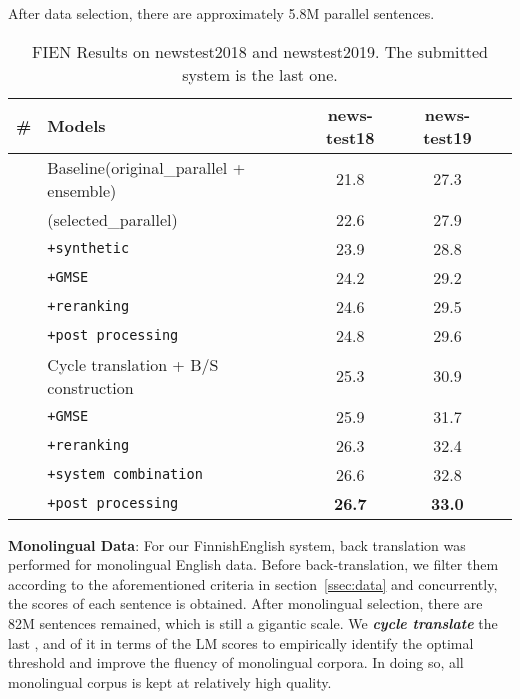 \documentclass[11pt,a4paper]{article}
\begin{document}
After data selection, there are approximately 5.8M parallel sentences.\\


\begin{table*}[hbt]
    \begin{center}
    \begin{tabular}{l|l|c|c|c}
    \hline
    \textbf{\#} & \textbf{Models} & news-test18 & news-test19 & \\ 
    \hline
     & Baseline\small{(original\_parallel + ensemble)} & 21.8 & 27.3 &  \\
    \hline
     & \small{(selected\_parallel)} & 22.6 & 27.9 &  \\
    \hline
     & \verb|+synthetic| & 23.9 & 28.8 & \\
     & \verb|+GMSE| & 24.2 & 29.2 & \\
     & \verb|+reranking| & 24.6 & 29.5 & \\
     & \verb|+post processing| & 24.8 & 29.6 & \\
    \hline
     & Cycle translation + B/S construction & 25.3 & 30.9 &  \\
    \hline
     & \verb|+GMSE| & 25.9 & 31.7 & \\
     & \verb|+reranking| & 26.3 & 32.4 & \\
     & \verb|+system combination| & 26.6 & 32.8 & \\
    \rowcolor{mypink}
     & \verb|+post processing| & \textbf{26.7} & \textbf{33.0} & \\
    \hline
    \end{tabular}
    \end{center}
    \caption{\label{tab:result}FIEN Results on newstest2018 and newstest2019. The submitted system is the last one.}
\end{table*}

\textbf{Monolingual Data}:
For our FinnishEnglish system, back translation was performed for monolingual English data. Before back-translation, we filter them according to the aforementioned criteria in section~\ref{ssec:data} and concurrently, the scores of each sentence is obtained. After monolingual selection, there are 82M sentences remained, which is still a gigantic scale. We \textbf{\textit{cycle translate}} the last ,  and  of it in terms of the LM scores to empirically identify the optimal threshold and improve the fluency of monolingual corpora. In doing so, all monolingual corpus is kept at relatively high quality.\\
\end{document}
